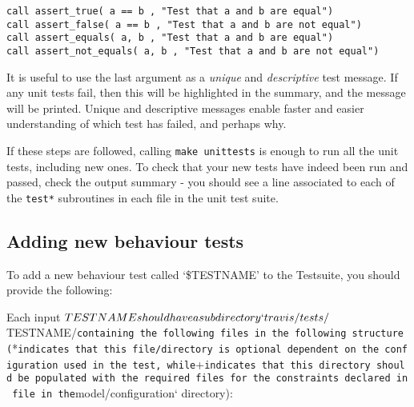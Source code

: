 \begin{verbatim}
call assert_true( a == b , "Test that a and b are equal")
call assert_false( a == b , "Test that a and b are not equal")
call assert_equals( a, b , "Test that a and b are equal")
call assert_not_equals( a, b , "Test that a and b are not equal")
\end{verbatim}

It is useful to use the last argument as a \emph{unique} and
\emph{descriptive} test message. If any unit tests fail, then this will
be highlighted in the summary, and the message will be printed. Unique
and descriptive messages enable faster and easier understanding of which
test has failed, and perhaps why.

If these steps are followed, calling \texttt{make\ unittests} is enough
to run all the unit tests, including new ones. To check that your new
tests have indeed been run and passed, check the output summary - you
should see a line associated to each of the \texttt{test*} subroutines
in each file in the unit test suite.

\subsection{Adding new behaviour tests} \label{subsec:adding-new-behaviour-tests}

To add a new behaviour test called `\$TESTNAME' to the Testsuite, you
should provide the following:

Each input
\(TESTNAME should have a subdirectory `travis/tests/\)TESTNAME/\texttt{containing\ the\ following\ files\ in\ the\ following\ structure\ (}*\texttt{indicates\ that\ this\ file/directory\ is\ optional\ dependent\ on\ the\ configuration\ used\ in\ the\ test,\ while}+\texttt{indicates\ that\ this\ directory\ should\ be\ populated\ with\ the\ required\ files\ for\ the\ constraints\ declared\ in\ file\ in\ the}model/configuration`
directory):

